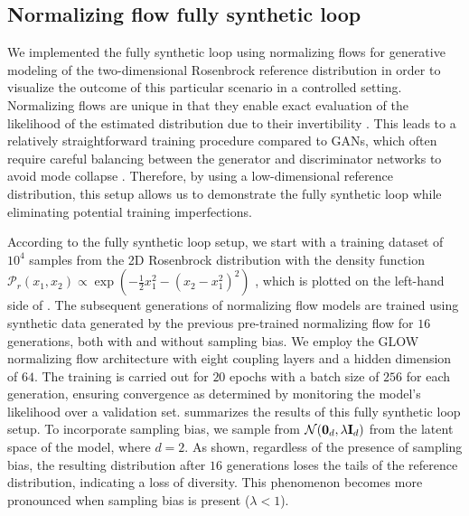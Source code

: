 \documentclass{article}
\def\bias{{\lambda}}
\def\colorSynthetic{colorA}
\def\synthetic{\textcolor{\colorSynthetic}{fully synthetic loop}}
\begin{document}
\subsection{Normalizing flow \synthetic{}}


We implemented the \synthetic{} using normalizing flows \cite{dinh2016density, kingma2018glow} for generative modeling of the two-dimensional Rosenbrock reference distribution \cite{rosenbrock} in order to visualize the outcome of this particular scenario in a controlled setting. Normalizing flows are unique in that they enable exact evaluation of the likelihood of the estimated distribution due to their invertibility \cite{dinh2016density}. This leads to a relatively straightforward training procedure compared to GANs, which often require careful balancing between the generator and discriminator networks to avoid mode collapse \cite{NIPS2017_892c3b1c}. Therefore, by using a low-dimensional reference distribution, this setup allows us to demonstrate the \synthetic{} while eliminating potential training imperfections.

According to the \synthetic{} setup, we start with a training dataset of $10^4$ samples from the 2D Rosenbrock distribution with the density function $\mathcal{P}_r(x_1, x_2) \propto \exp \left( - \frac{1}{2} x_{1}^{2} - \left(x_{2}-x_{1}^{2} \right)^{2}\right)$ \cite{rosenbrock}, which is plotted on the left-hand side of . The subsequent generations of normalizing flow models are trained using synthetic data generated by the previous pre-trained normalizing flow for $16$ generations, both with and without sampling bias. We employ the GLOW normalizing flow architecture \cite{kingma2018glow} with eight coupling layers \cite{kingma2018glow} and a hidden dimension of $64$. The training is carried out for $20$ epochs with a batch size of $256$ for each generation, ensuring convergence as determined by monitoring the model's likelihood over a validation set.  summarizes the results of this \synthetic{} setup. To incorporate sampling bias, we sample from $\mathcal{N}(\bm{0}_d, \bias\mI_d)$ from the latent space of the model, where $d = 2$. As shown, regardless of the presence of sampling bias, the resulting distribution after $16$ generations loses the tails of the reference distribution, indicating a loss of diversity. This phenomenon becomes more pronounced when sampling bias is present ($\bias<1$).
\end{document}
